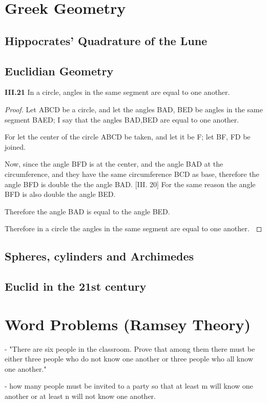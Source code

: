 \chapter{Greek Geometry}
\section{Hippocrates' Quadrature of the Lune}
\section{Euclidian Geometry}
\begin{prop}{\textbf{III.21}}
In a circle, angles in the same segment are equal to one another. 
\end{prop}
\begin{proof} 
Let ABCD be a circle, and let the angles BAD, BED be angles in the same segment BAED; I say that the angles BAD,BED are equal to one another.

For let the center of the circle ABCD be taken, and let it be F; let BF, FD be joined.

Now, since the angle BFD is at the center, and the angle BAD at the circumference, and they have the same circumference BCD as base, therefore the angle BFD is double the the angle BAD. [III. 20] For the same reason the angle BFD is also double the angle BED.

Therefore the angle BAD is equal to the angle BED.

Therefore in a circle the angles in the same segment are equal to one another. $\qedhere$
\end{proof}

\section{Spheres, cylinders and Archimedes}
\section{Euclid in the 21st century}

\chapter{Word Problems (Ramsey Theory)}
- "There are six people in the classroom. Prove that among them  there must be either three people who do not know one another or  three people who all know one another."

- how many people must be invited to a party so that at  least m will know one another or at least n will not know one another.

